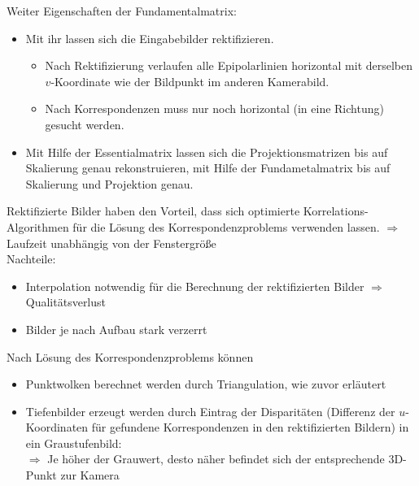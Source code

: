 Weiter Eigenschaften der Fundamentalmatrix:
\begin{itemize}
\item Mit ihr lassen sich die Eingabebilder rektifizieren.
\begin{itemize}
\item Nach Rektifizierung verlaufen alle Epipolarlinien horizontal mit derselben $v$-Koordinate wie der Bildpunkt im anderen Kamerabild.
\item Nach Korrespondenzen muss nur noch horizontal (in eine Richtung) gesucht werden.
\end{itemize}
\item Mit Hilfe der Essentialmatrix lassen sich die Projektionsmatrizen bis auf Skalierung genau rekonstruieren, mit Hilfe der Fundametalmatrix bis auf Skalierung und Projektion genau.
\end{itemize}
Rektifizierte Bilder haben den Vorteil, dass sich optimierte Korrelations-Algorithmen für die Lösung des Korrespondenzproblems verwenden lassen. $\Rightarrow$ Laufzeit unabhängig von der Fenstergröße \\
Nachteile:
\begin{itemize}
\item Interpolation notwendig für die Berechnung der rektifizierten Bilder $\Rightarrow$ Qualitätsverlust
\item Bilder je nach Aufbau stark verzerrt
\end{itemize}
Nach Lösung des Korrespondenzproblems können
\begin{itemize}
\item Punktwolken berechnet werden durch Triangulation, wie zuvor erläutert
\item Tiefenbilder erzeugt werden durch Eintrag der Disparitäten (Differenz der $u$-Koordinaten für gefundene Korrespondenzen in den rektifizierten Bildern) in ein Graustufenbild: \\ $\Rightarrow$ Je höher der Grauwert, desto näher befindet sich der entsprechende 3D-Punkt zur Kamera
\end{itemize}




































